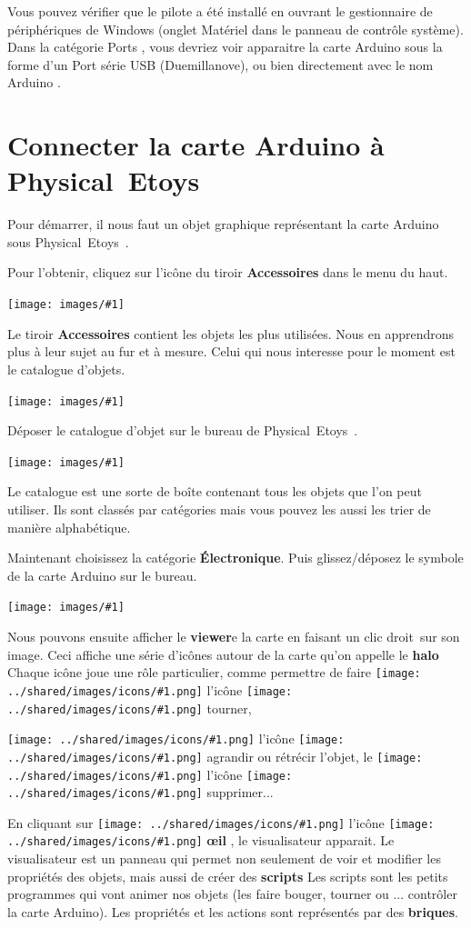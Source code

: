 \documentclass[a4paper,12pt]{article}
\def\appName{Physical~Etoys~}
\def\rc{clic droit~}
\newcommand{\screenshot}[1]
{
\begin{center}
	\texttt{[image: images/\#1]}
\end{center}
}
\newcommand{\important}[1]{\textbf{#1}}
\newcommand{\keyword}[2]{\important{\gls{#1}}}
\newcommand{\keywordpl}[2]{\important{\glspl{#1}}}
\newcommand{\inserticon}[1]
{
\texttt{[image: ../shared/images/icons/\#1.png]}
}
\newcommand{\icon}[2][]
{
\ifthenelse {\equal{#1} {}} {\inserticon{#2}} {l'icône \inserticon{#2} \important{#1}}
}
\begin{document}
Vous pouvez vérifier que le pilote a été installé en ouvrant le gestionnaire de
périphériques de Windows (onglet \og Matériel \fg dans le panneau de contrôle
système).  Dans la catégorie \og Ports \fg, vous devriez voir apparaitre la
carte Arduino sous la forme d'un \og Port série USB \fg (Duemillanove), ou bien
directement avec le nom \og Arduino \fg.

\section{Connecter la carte Arduino à \appName}

Pour démarrer, il nous faut un objet graphique représentant la carte Arduino
sous \appName.

Pour l'obtenir, cliquez sur l'icône du tiroir \important{Accessoires} dans le menu du haut.

\screenshot{01.png}

Le tiroir \important{Accessoires} contient les objets les plus utilisées. Nous en
apprendrons plus à leur sujet au fur et à mesure. Celui qui nous interesse pour
le moment est le catalogue d'objets.

\screenshot{02.png}

Déposer le catalogue d'objet sur le bureau de \appName.

\screenshot{03.png}

Le catalogue est une sorte de boîte contenant tous les objets que l'on peut
utiliser. Ils sont classés par catégories mais vous pouvez les aussi les trier
de manière alphabétique.

Maintenant choisissez la catégorie \important{Électronique}. Puis glissez/déposez le
symbole de la carte Arduino sur le bureau.

\screenshot{04.png}
  
Nous pouvons ensuite afficher le \keyword{viewer} de la carte en faisant un
\rc sur son image. Ceci affiche une série d'icônes autour de la carte qu'on
appelle le \keyword{halo}. Chaque icône joue une rôle particulier, comme permettre de faire \icon{rotate} tourner,
\icon{scale} agrandir ou rétrécir l'objet, le \icon{close} supprimer...

En cliquant sur \icon[\oe il]{eye}, le visualisateur apparait. Le visualisateur
est un panneau qui permet non seulement de voir et modifier les propriétés des
objets, mais aussi de créer des \keywordpl{script}. Les scripts sont les
petits programmes qui vont animer nos objets (les faire bouger, tourner ou ...
contrôler la carte Arduino).  Les propriétés et les actions sont représentés
par des \important{briques}.
\end{document}
